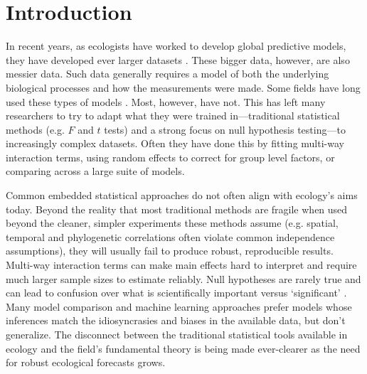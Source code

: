 \documentclass[11pt]{article}
\begin{document}
\section*{Introduction}
In recent years, as ecologists have worked to develop global predictive models, they have developed ever larger datasets \citep{Hampton2013}. These bigger data, however, are also messier data. Such data generally requires a model of both the underlying biological processes and how the measurements were made. Some fields have long used these types of models \citep[generally in fields focused on inferring population sizes of things people want to eat or manage,][]{muthuku2008,zheng2007,trijoulet2018,strinella2020potential}. Most, however, have not. This has left many researchers to try to adapt what they were trained in---traditional statistical methods (e.g. $F$ and $t$ tests) and a strong focus on null hypothesis testing---to increasingly complex datasets. Often they have done this by fitting multi-way interaction terms, using random effects to correct for group level factors, or comparing across a large suite of models. %

Common embedded statistical approaches do not often align with ecology's aims today. Beyond the reality that most traditional methods are fragile when used beyond the cleaner, simpler experiments these methods assume (e.g. spatial, temporal and phylogenetic correlations often violate common independence assumptions), they will usually fail to produce robust, reproducible results. Multi-way interaction terms can make main effects hard to interpret and require much larger sample sizes to estimate reliably. Null hypotheses are rarely true and can lead to confusion over what is scientifically important versus `significant' \citep{gelmanhill,muff2022rewriting}. Many model comparison and machine learning approaches prefer models whose inferences match the idiosyncrasies and biases in the available data, but don’t generalize. The disconnect between the traditional statistical tools available in ecology and the field's fundamental theory is being made ever-clearer as the need for robust ecological forecasts grows. 
\end{document}
